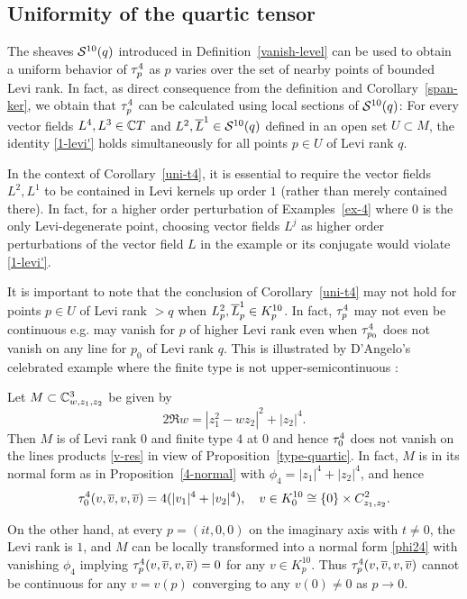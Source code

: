 \documentclass[12pt]{amsart}
\begin{document}
\subsection{Uniformity of the quartic tensor}
The sheaves  ${\mathcal{S}}^{10}(q)$
introduced in Definition~\ref{vanish-level}
 can be used to 
obtain a uniform behavior of 
$\tau^4_p$ as $p$ varies
over the set of nearby points
of bounded Levi rank.
In fact, as direct consequence
from the definition and Corollary~\ref{span-ker}, 
we obtain
that  $\tau^4_p$
can be calculated using local sections of ${\mathcal{S}}^{10}(q)$:
\bc{}
For every 
vector fields $L^4, L^3\in {\mathbb{C}} T$
and $L^2, \overline{L}^1\in {\mathcal{S}}^{10}(q)$
defined in an open set $U\subset M$,
the identity 
\eqref{1-levi'} holds
simultaneously
for all points $p\in U$
of Levi rank $q$.
\ec


\br
In the context of Corollary~\ref{uni-t4},
it is essential to require the vector fields $L^2, L^1$
to be contained in Levi kernels up order $1$ (rather than merely contained there).
In fact, for a higher order perturbation of Examples~\ref{ex-4} where 
$0$ is the only Levi-degenerate point, 
choosing vector fields $L^j$ as higher order perturbations of
the vector field $L$ in the example or its conjugate
would violate \eqref{1-levi'}.
\er


It is important to note that the conclusion of Corollary~\ref{uni-t4}
may not hold for points $p\in U$ of Levi rank $>q$
when $L^2_p, \overline{L}^1_p\in K^{10}_p$.
In fact, $\tau^4_p$ may not even be continuous 
e.g. may vanish for $p$ of higher Levi rank even when $\tau^4_{p_0}$ does not vanish 
on any line for $p_0$ of Levi rank $q$.
This is illustrated by D'Angelo's celebrated example 
where the finite type is not upper-semicontinuous \cite{D80, D82}:


\be[J. P. D'Angelo]
Let $M\subset{\mathbb{C}}^3_{w, z_1, z_2}$ be given by
$$
	2\Re w = |z_1^2 - w z_2|^2 + |z_2|^4.
$$
Then $M$ is of Levi rank $0$ and finite type $4$ at $0$ and hence $\tau^4_0$ does not vanish on the lines 
products \eqref{v-res} in view of Proposition~\ref{type-quartic}.
In fact, $M$ is in its normal form as in Proposition~\ref{4-normal} with
$\phi_4 = |z_1|^4 + |z_2|^4$, and hence 
$$
	\tau^4_0(v, \overline{v}, v, \overline{v}) = 4(|v_1|^4 + |v_2|^4),
	\quad v\in K^{10}_0 \cong \{0\} \times C^2_{z_1, z_2}.
$$

On the other hand, at every $p=(it, 0, 0)$ on the imaginary axis with $t\ne 0$,
the Levi rank is $1$, and $M$ can be locally transformed into a normal form 
\eqref{phi24} with vanishing $\phi_4$ implying $\tau^4_p(v, \overline{v}, v, \overline{v})=0$
for any $v\in K^{10}_p$. Thus $\tau^4_p(v, \overline{v}, v, \overline{v})$ cannot be continuous
for any $v=v(p)$ converging to any $v(0)\ne 0$
as $p\to 0$.
\end{document}
